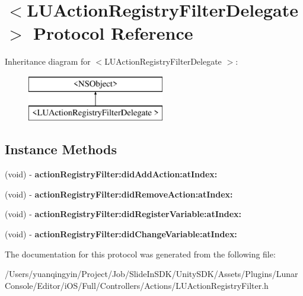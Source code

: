 \hypertarget{protocol_l_u_action_registry_filter_delegate_01-p}{}\section{$<$L\+U\+Action\+Registry\+Filter\+Delegate $>$ Protocol Reference}
\label{protocol_l_u_action_registry_filter_delegate_01-p}
Inheritance diagram for $<$L\+U\+Action\+Registry\+Filter\+Delegate $>$\+:\begin{figure}[H]
\begin{center}
\leavevmode
\includegraphics[height=2.000000cm]{protocol_l_u_action_registry_filter_delegate_01-p}
\end{center}
\end{figure}
\subsection*{Instance Methods}
\begin{DoxyCompactItemize}
\item 
\mbox{\label{protocol_l_u_action_registry_filter_delegate_01-p_a0a47bedf20a9251db36dc351c1060250}} 
(void) -\/ {\bfseries action\+Registry\+Filter\+:did\+Add\+Action\+:at\+Index\+:}
\item 
\mbox{\label{protocol_l_u_action_registry_filter_delegate_01-p_acbe572ba954df9d146b356d7ec114723}} 
(void) -\/ {\bfseries action\+Registry\+Filter\+:did\+Remove\+Action\+:at\+Index\+:}
\item 
\mbox{\label{protocol_l_u_action_registry_filter_delegate_01-p_afbd66f34372336b12252a5e5faf5c0ad}} 
(void) -\/ {\bfseries action\+Registry\+Filter\+:did\+Register\+Variable\+:at\+Index\+:}
\item 
\mbox{\label{protocol_l_u_action_registry_filter_delegate_01-p_a369b32060837bec2505e9b31ccd43d4a}} 
(void) -\/ {\bfseries action\+Registry\+Filter\+:did\+Change\+Variable\+:at\+Index\+:}
\end{DoxyCompactItemize}


The documentation for this protocol was generated from the following file\+:\begin{DoxyCompactItemize}
\item 
/\+Users/yuanqingyin/\+Project/\+Job/\+Slide\+In\+S\+D\+K/\+Unity\+S\+D\+K/\+Assets/\+Plugins/\+Lunar\+Console/\+Editor/i\+O\+S/\+Full/\+Controllers/\+Actions/L\+U\+Action\+Registry\+Filter.\+h\end{DoxyCompactItemize}
